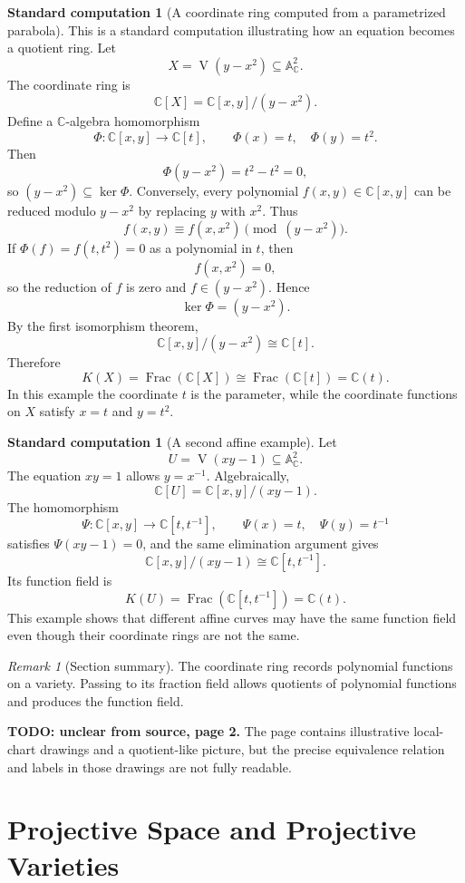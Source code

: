\documentclass[11pt]{article}
\theoremstyle{definition}
\newtheorem{calculation}[theorem]{Standard computation}
\theoremstyle{remark}
\newtheorem{remark}[theorem]{Remark}
\newcommand{\A}{\mathbb{A}}
\newcommand{\C}{\mathbb{C}}
\newcommand{\K}{K}
\newcommand{\V}{\operatorname{V}}
\newcommand{\Frac}{\operatorname{Frac}}
\newcommand{\sourceunclear}[2]{%
  \par\smallskip
  \noindent\textbf{TODO: unclear from source, page #1.} #2
  \par\smallskip
}
\begin{document}
\begin{calculation}[A coordinate ring computed from a parametrized parabola]
This is a standard computation illustrating how an equation becomes a quotient
ring.  Let
\[
  X=\V(y-x^2)\subseteq \A^2_{\C}.
\]
The coordinate ring is
\[
  \C[X]=\C[x,y]/(y-x^2).
\]
Define a \(\C\)-algebra homomorphism
\[
  \Phi\colon \C[x,y]\longrightarrow \C[t],
  \qquad
  \Phi(x)=t,\quad \Phi(y)=t^2.
\]
Then
\[
  \Phi(y-x^2)=t^2-t^2=0,
\]
so \((y-x^2)\subseteq \ker\Phi\).  Conversely, every polynomial
\(f(x,y)\in \C[x,y]\) can be reduced modulo \(y-x^2\) by replacing \(y\) with
\(x^2\).  Thus
\[
  f(x,y)\equiv f(x,x^2)\pmod{(y-x^2)}.
\]
If \(\Phi(f)=f(t,t^2)=0\) as a polynomial in \(t\), then
\[
  f(x,x^2)=0,
\]
so the reduction of \(f\) is zero and \(f\in (y-x^2)\).  Hence
\[
  \ker\Phi=(y-x^2).
\]
By the first isomorphism theorem,
\[
  \C[x,y]/(y-x^2)\cong \C[t].
\]
Therefore
\[
  \K(X)=\Frac(\C[X])\cong \Frac(\C[t])=\C(t).
\]
In this example the coordinate \(t\) is the parameter, while the coordinate
functions on \(X\) satisfy \(x=t\) and \(y=t^2\).
\end{calculation}

\begin{calculation}[A second affine example]
Let
\[
  U=\V(xy-1)\subseteq \A^2_{\C}.
\]
The equation \(xy=1\) allows \(y=x^{-1}\).  Algebraically,
\[
  \C[U]=\C[x,y]/(xy-1).
\]
The homomorphism
\[
  \Psi\colon \C[x,y]\longrightarrow \C[t,t^{-1}],
  \qquad
  \Psi(x)=t,\quad \Psi(y)=t^{-1}
\]
satisfies \(\Psi(xy-1)=0\), and the same elimination argument gives
\[
  \C[x,y]/(xy-1)\cong \C[t,t^{-1}].
\]
Its function field is
\[
  \K(U)=\Frac(\C[t,t^{-1}])=\C(t).
\]
This example shows that different affine curves may have the same function
field even though their coordinate rings are not the same.
\end{calculation}

\begin{remark}[Section summary]
The coordinate ring records polynomial functions on a variety.  Passing to its
fraction field allows quotients of polynomial functions and produces the
function field.
\end{remark}

\sourceunclear{2}{The page contains illustrative local-chart drawings and a
quotient-like picture, but the precise equivalence relation and labels in
those drawings are not fully readable.}

\section{Projective Space and Projective Varieties}
\end{document}
